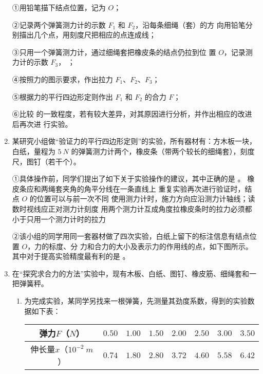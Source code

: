 \begin{enumerate}
①用铅笔描下结点位置，记为 $ O $；

②记录两个弹簧测力计的示数 $ F_{1} $ 和 $ F_{2} $，沿每条细绳（套）的方
向用铅笔分别描出几个点，用刻度尺把相应的点连成线；

③只用一个弹簧测力计，通过细绳套把橡皮条的结点仍拉到位
置 $ O $，记录测力计的示数
$ F_{3} $，
；

④按照力的图示要求，作出拉力 $ F_{1} $、$ F_{2} $、$ F_{3} $；

⑤根据力的平行四边形定则作出 $ F_{1} $ 和 $ F_{2} $ 的合力 $ F $；


⑥比较
的一致程度，若有较大差异，对其原因进行分析，并作出相应的改进后再次进
行实验。




\newpage
\item
{}
某研究小组做“验证力的平行四边形定则”的实验，所有器材有：方木板一块，
白纸，量程为 $ 5 \ N $ 的弹簧测力计两个，橡皮条（带两个较长的细绳套），刻度尺，图钉（若干个）。


①具体操作前，同学们提出了如下关于实验操作的建议，其中正确的是  。
\fourchoices
{橡皮条应和两绳套夹角的角平分线在一条直线上}
{重复实验再次进行验证时，结点 $ O $ 的位置可以与前一次不同}
{使用测力计时，施力方向应沿测力计轴线；读数时视线应正对测力计刻度}
{用两个测力计互成角度拉橡皮条时的拉力必须都小于只用一个测力计时的拉力}


②该小组的同学用同一套器材做了四次实验，白纸上留下的标注信息有结点位置 $ O $，力的标度、分
力和合力的大小及表示力的作用线的点，如下图所示。其中对于提高实验精度最有利的是 。
\begin{figure}[h!]
\centering

\end{figure}




\newpage
\item
{}
在“探究求合力的方法”实验中，现有木板、白纸、图钉、橡皮筋、细绳套和一把弹簧秤。
\begin{enumerate}
\renewcommand{\labelenumi}{\arabic{enumi}.}
\item
为完成实验，某同学另找来一根弹簧，先测量其劲度系数，得到的实验数据如下表：
\begin{table}[h!]
\centering 
\begin{tabular}{|c|c|c|c|c|c|c|c|}
\hline 
弹力$ F $（$ N $） & $ 0.50 $ & $ 1.00 $ & $ 1.50 $ & $ 2.00 $ & $ 2.50 $ & $ 3.00 $ & $ 3.50 $
\\
\hline
伸长量$ x $（$ 10^{-2} \ m $） & $ 0.74 $ & $ 1.80 $ & $ 2.80 $ & $ 3.72 $ & $ 4.60 $ & $ 5.58 $ & $ 6.42 $\\ 
\hline 
\end{tabular}
\end{table} 



\end{enumerate}
\end{enumerate}
